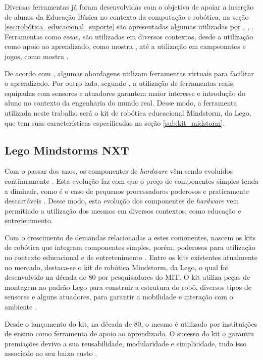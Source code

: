 Diversas ferramentas já foram desenvolvidas com o objetivo de apoiar a inserção de alunos da Educação Básica no contexto da computação e robótica, na seção \ref{sec:robótica_educacional_suporte} são apresentadas algumas utilizadas por \cite{analiseFerramentaEnsinoComputacao}, \cite{projetoRoboticaMauricio}, \cite{simpleRobotsIntroductionEng}. Ferramentas como essas, são utilizadas em diversos contextos, desde a utilização como apoio ao aprendizado, como mostra \cite{teachingWithRoboticKit}, até a utilização em campeonatos e jogos, como mostra \cite{ciber-rato}. 

De acordo com \cite{analiseFerramentaEnsinoComputacao}, algumas abordagens utilizam ferramentas virtuais para facilitar o aprendizado. Por outro lado, segundo \cite{simpleMobile}, a utilização de ferramentas reais, equipadas com sensores e atuadores garantem maior interesse e introdução do aluno no contexto da engenharia do mundo real. Desse modo, a ferramenta utilizada neste trabalho será o kit de robótica educacional Mindstorm, da Lego, que tem suas características especificadas na seção \ref{sub:kit_midstorm}.

\subsection{Lego Mindstorms NXT} %
\label{sub:kit_mindstorm}

Com o passar dos anos, os componentes de \textit{hardware} vêm sendo evoluídos continuamente \cite{teachingWithRoboticKit}. Esta evolução faz com que o preço de componentes simples tenda a diminuir, como é o caso de pequenos processadores poderosos e praticamente descartáveis \cite{teachingWithRoboticKit}. Desse modo, esta evolução dos componentes de \textit{hardware} vem permitindo a utilização dos mesmos em diversos contextos, como educação e entretenimento. 

Com o crescimento de demandas relacionadas a estes comonentes, nascem os kits de robótica que integram componentes simples, porém, poderosos para utilização no contexto educacional e de entretenimento \cite{teachingWithRoboticKit}. Entre os kits existentes atualmente no mercado, destaca-se o kit de robótica Mindstorm, da Lego, o qual foi desenvolvido na década de 80 por pesquisadores do MIT. O kit utiliza peças de montagem no padrão Lego para construir a estrutura do robô, diversos tipos de sensores e alguns atuadores, para garantir a mobilidade e interação com o ambiente \cite{teachingWithRoboticKit}.

Desde o lançamento do kit, na década de 80, o mesmo é utilizado por instituições de ensino como ferramenta de apoio ao aprendizado. O sucesso do kit o garantiu premiações devivo a sua reusabilidade, modularidade e simplicidade, tudo isso associado ao seu baixo custo \cite{teachingWithRoboticKit}.

